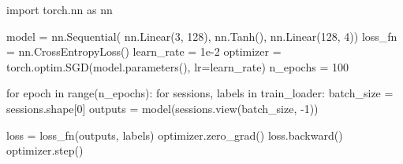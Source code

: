 \begin{mypython}[float={h}, caption={Modelo de la red y enrenamiento con los datos artificiales.}, label={code:model}]
import torch.nn as nn

model = nn.Sequential(
  nn.Linear(3, 128),
  nn.Tanh(),
  nn.Linear(128, 4))
loss_fn = nn.CrossEntropyLoss()
learn_rate = 1e-2
optimizer = torch.optim.SGD(model.parameters(), lr=learn_rate)
n_epochs = 100

for epoch in range(n_epochs):
  for sessions, labels in train_loader:
    batch_size = sessions.shape[0]
    outputs = model(sessions.view(batch_size, -1))

    loss = loss_fn(outputs, labels)
    optimizer.zero_grad()
    loss.backward()
    optimizer.step()
\end{mypython}

